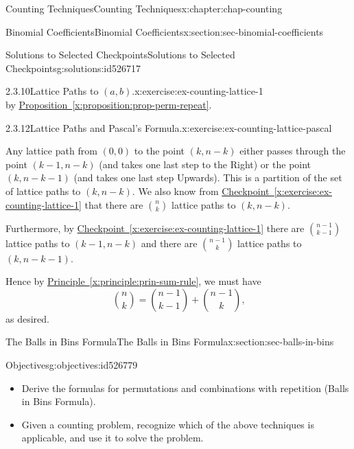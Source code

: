 \documentclass[oneside,10pt,]{book}
\newcommand{\xreffont}{\relax}
\numberwithin{equation}{section}
\begin{document}
\begin{chapterptx}{Counting Techniques}{}{Counting Techniques}{}{}{x:chapter:chap-counting}
\begin{sectionptx}{Binomial Coefficients}{}{Binomial Coefficients}{}{}{x:section:sec-binomial-coefficients}
\begin{solutions-subsection-numberless}{Solutions to Selected Checkpoints}{}{Solutions to Selected Checkpoints}{}{}{g:solutions:id526717}
\begin{inlinesolution}{2.3.10}{Lattice Paths to \((a,b)\).}{x:exercise:ex-counting-lattice-1}
\begin{equation*}
\end{equation*}
by \hyperref[x:proposition:prop-perm-repeat]{Proposition~{\xreffont\ref{x:proposition:prop-perm-repeat}}}.%
\end{inlinesolution}%
\begin{inlinesolution}{2.3.12}{Lattice Paths and Pascal's Formula.}{x:exercise:ex-counting-lattice-pascal}%
\par\smallskip%
\noindent\hypertarget{g:solution:id526698-main}{}Any lattice path from \((0,0)\) to the point \((k,n-k)\) either passes through the point \((k-1,n-k)\) (and takes one last step to the Right) or the point \((k,n-k-1)\) (and takes one last step Upwards). This is a partition of the set of lattice paths to \((k,n-k)\). We also know from \hyperref[x:exercise:ex-counting-lattice-1]{Checkpoint~{\xreffont\ref{x:exercise:ex-counting-lattice-1}}} that there are \(\displaystyle\binom{n}{k}\) lattice paths to \((k,n-k)\).%
\par
Furthermore, by \hyperref[x:exercise:ex-counting-lattice-1]{Checkpoint~{\xreffont\ref{x:exercise:ex-counting-lattice-1}}} there are \(\displaystyle\binom{n-1}{k-1}\) lattice paths to \((k-1,n-k)\) and there are \(\displaystyle\binom{n-1}{k}\) lattice paths to \((k,n-k-1)\).%
\par
Hence by \hyperref[x:principle:prin-sum-rule]{Principle~{\xreffont\ref{x:principle:prin-sum-rule}}}, we must have%
\begin{equation*}
\binom{n}{k} = \binom{n-1}{k-1} + \binom{n-1}{k}\text{,}
\end{equation*}
as desired.%
\end{inlinesolution}%
\end{solutions-subsection-numberless}
\end{sectionptx}
%
%
\typeout{************************************************}
\typeout{************************************************}
%
\begin{sectionptx}{The Balls in Bins Formula}{}{The Balls in Bins Formula}{}{}{x:section:sec-balls-in-bins}
\begin{objectives}{Objectives}{g:objectives:id526779}
%
\begin{itemize}[label=\textbullet]
\item{}Derive the formulas for permutations and combinations with repetition (Balls in Bins Formula).%
\item{}Given a counting problem, recognize which of the above techniques is applicable, and use it to solve the problem.%

\end{itemize}
\end{objectives}
\end{sectionptx}
\end{chapterptx}
\end{document}

